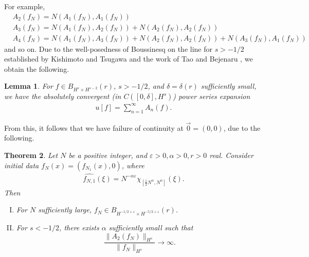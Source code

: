 \documentclass[12pt,reqno]{amsart}
\numberwithin{equation}{section}  %
\newcommand{\wh}{\widehat}
\newcommand{\ee}{\varepsilon}
\newtheorem{theorem}{Theorem}[section]
\newtheorem{lemma}[theorem]{Lemma}
\begin{document}
%
%
%
For example, 
%
%
\begin{equation*}
\begin{split}
  & A_{2}(f_{N}) = N(A_{1}(f_{N}), A_{1}(f_{N}))
  \\
  & A_{3}(f_{N}) = N(A_{1}(f_{N}), A_{2}(f_{N})) + N(A_{2}(f_{N}), A_{2}(f_{N}))
  \\
  & A_{4}(f_{N})= N(A_{1}(f_{N}), A_{3}(f_{N})) + N(A_{2}(f_{N}), A_{2}(f_{N}))
  + N(A_{3}(f_{N}), A_{1}(f_{N}))
\end{split}
\end{equation*}
%
%
and so on. Due to the well-posedness of 
Boussinesq on the line for $s>-1/2$ established by
Kishimoto and Tsugawa \cite{Kishimoto:2010ly} and the work of
Tao and Bejenaru \cite{Bejenaru-Tao-2006-Sharp-well-posedness-and-ill-posedness},
we obtain the
following. 
\begin{lemma}
  \label{lem:qwp-awp}
  For $f \in B_{H^{s} \times H^{s-2}}(r)$, $s > -1/2$,  and $\delta=\delta(r)$
sufficiently small, we have the absolutely convergent
(in $C([0, \delta], H^{s})$) power series expansion
%
%
\begin{equation}
  \label{power-series-soln}
\begin{split}
  u[f] = \sum_{n=1}^{\infty} A_{n}(f).
\end{split}
\end{equation}
%
%
\label{lem:analytic-wp}
\end{lemma}
%
%
From this, it follows that we have failure of continuity at $\vec{0} =
(0, 0)$, due to the
following.
%
%
%
%
%
%
%
%
%
%
%
\begin{theorem}
  Let $N$ be a positive integer, and $\ee > 0, \alpha > 0, r > 0$ real. Consider
  initial data $f_{N}(x) = (f_{N_{1}}(x), 0)$, where
    \begin{equation*}
  \begin{split}
    \wh{f_{N,1}}(\xi) = N^{-\alpha
    \ee}\chi_{[\frac{1}{2}N^{\alpha},N^{\alpha}]}(\xi).
  \end{split}
  \end{equation*}
  Then  
    \begin{enumerate}[(I)]
      \item{ For $N$ sufficiently large, 
        $ f_{N} \in B_{H^{-1/2 + \ee} \times H^{-5/2 + \ee}}(r)$}.
        \label{1uu}
        \\
  \item{ For $s<-1/2$, there exists $\alpha$ sufficiently small such that
    $$\frac{\|A_{2}(f_{N}) \|_{H^{s}}}{\| f_{N} \|_{H^{s}}} \to \infty.$$}
    \label{2uu}
\end{enumerate}
\label{thm:ill-pos}
\end{theorem}
\end{document}
